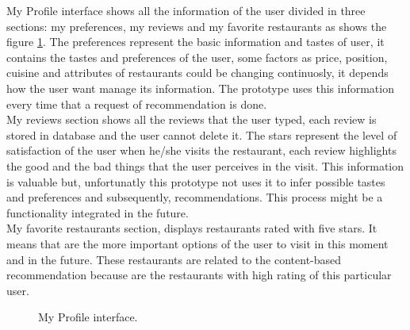 My Profile interface shows all the information of the user divided in
three sections: my preferences, my reviews and my favorite restaurants
as shows the figure \ref{fig:myprofile}. The preferences represent the basic
information and tastes of user, it contains the tastes and preferences
of the user, some factors as price, position, cuisine and attributes
of restaurants could be changing continuosly, it depends how the user
want manage its information. The prototype uses this information every
time that a request of recommendation is done.\\
My reviews section shows all the reviews that the user typed, each
review is stored in database and the user cannot delete it. The stars
represent the level of satisfaction of the user when he/she visits the
restaurant, each review highlights the good and the bad things that
the user perceives in the visit. This information is valuable but,
unfortunatly this prototype not uses it to infer possible tastes and
preferences and subsequently, recommendations. This process might be a
functionality integrated in the future.\\
My favorite restaurants section, displays restaurants rated with five
stars. It means that are the more important options of the user to
visit in this moment and in the future. These restaurants are related
to the content-based recommendation because are the restaurants with
high rating of this particular user.
\begin{figure}
\captionsetup{font=footnotesize}
\centering
{}
\caption{My Profile interface.}
\label{fig:myprofile}   
\end{figure}
